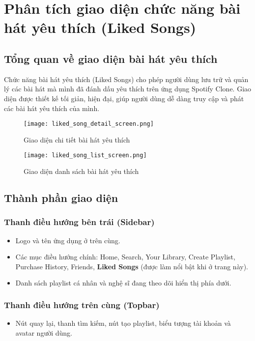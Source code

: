 \documentclass{book}
\let\oldsection\section
\renewcommand{\section}{\clearpage\oldsection}
\begin{document}
\section{Phân tích giao diện chức năng bài hát yêu thích (Liked Songs)}

\subsection{Tổng quan về giao diện bài hát yêu thích}
Chức năng bài hát yêu thích (Liked Songs) cho phép người dùng lưu trữ và quản lý các bài hát mà mình đã đánh dấu yêu thích trên ứng dụng Spotify Clone. Giao diện được thiết kế tối giản, hiện đại, giúp người dùng dễ dàng truy cập và phát các bài hát yêu thích của mình.

\begin{figure}[h!]
\centering
\texttt{[image: liked\_song\_detail\_screen.png]} %
\caption{Giao diện chi tiết bài hát yêu thích}
\label{fig:liked_song_detail}
\end{figure}

\begin{figure}[h!]
\centering
\texttt{[image: liked\_song\_list\_screen.png]} %
\caption{Giao diện danh sách bài hát yêu thích}
\label{fig:liked_songs_list}
\end{figure}

\subsection{Thành phần giao diện}

\subsubsection{Thanh điều hướng bên trái (Sidebar)}
\begin{itemize}
    \item Logo và tên ứng dụng ở trên cùng.
    \item Các mục điều hướng chính: Home, Search, Your Library, Create Playlist, Purchase History, Friends, \textbf{Liked Songs} (được làm nổi bật khi ở trang này).
    \item Danh sách playlist cá nhân và nghệ sĩ đang theo dõi hiển thị phía dưới.
\end{itemize}

\subsubsection{Thanh điều hướng trên cùng (Topbar)}
\begin{itemize}
    \item Nút quay lại, thanh tìm kiếm, nút tạo playlist, biểu tượng tài khoản và avatar người dùng.
\end{itemize}
\end{document}

